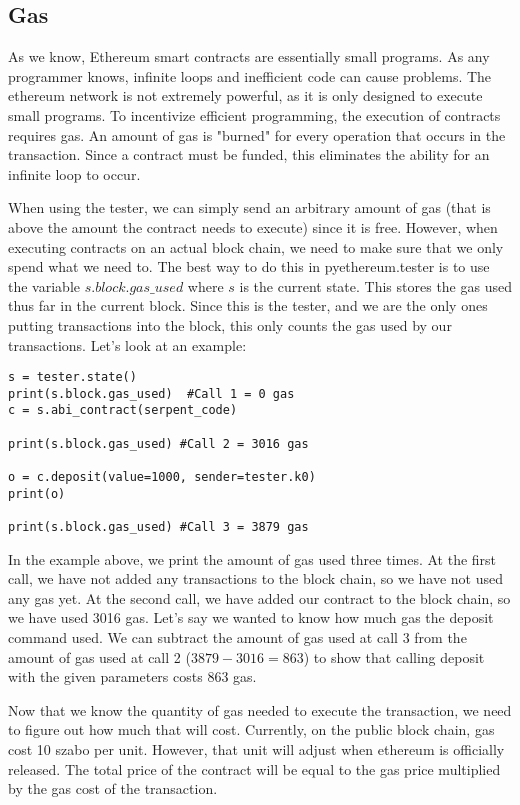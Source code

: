 \documentclass[12pt]{article}
\begin{document}
\subsection{Gas}
As we know, Ethereum smart contracts are essentially small programs. As any programmer knows, infinite loops and inefficient code can cause problems. The ethereum network is not extremely powerful, as it is only designed to execute small programs. To incentivize efficient programming, the execution of contracts requires gas. An amount of gas is "burned" for every operation that occurs in the transaction. Since a contract must be funded, this eliminates the ability for an infinite loop to occur.

When using the tester, we can simply send an arbitrary amount of gas (that is above the amount the contract needs to execute) since it is free. However, when executing contracts on an actual block chain, we need to make sure that we only spend what we need to. The best way to do this in pyethereum.tester is to use the variable $s.block.gas\_used$ where $s$ is the current state. This stores the gas used thus far in the current block. Since this is the tester, and we are the only ones putting transactions into the block, this only counts the gas used by our transactions. Let's look at an example:

\begin{verbatim}
s = tester.state()
print(s.block.gas_used)  #Call 1 = 0 gas
c = s.abi_contract(serpent_code)

print(s.block.gas_used) #Call 2 = 3016 gas

o = c.deposit(value=1000, sender=tester.k0)
print(o)

print(s.block.gas_used) #Call 3 = 3879 gas
\end{verbatim}

In the example above, we print the amount of gas used three times. At the first call, we have not added any transactions to the block chain, so we have not used any gas yet. At the second call, we have added our contract to the block chain, so we have used 3016 gas. Let's say we wanted to know how much gas the deposit command used. We can subtract the amount of gas used at call 3 from the amount of gas used at call 2 ($3879-3016 = 863$) to show that calling deposit with the given parameters costs 863 gas. 

Now that we know the quantity of gas needed to execute the transaction, we need to figure out how much that will cost. Currently, on the public block chain, gas cost 10 szabo per unit. However, that unit will adjust when ethereum is officially released. The total price of the contract will be equal to the gas price multiplied by the gas cost of the transaction.
\end{document}
